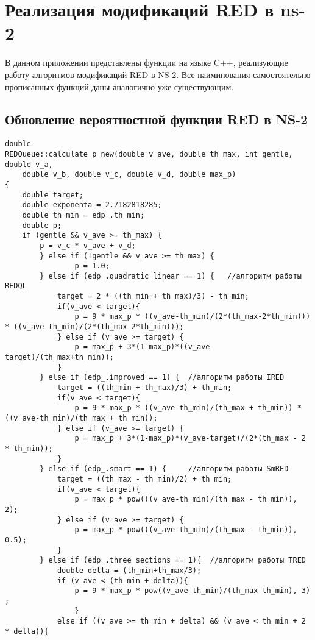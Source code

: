 
\chapter{Реализация модификаций RED в ns-2}
\label{app2}

В данном приложении представлены функции на языке C++, 
реализующие работу алгоритмов модификаций RED в NS-2.
Все наиминования самостоятельно прописанных функций даны 
аналогично уже существующим.

\section{Обновление вероятностной функции RED в NS-2}
\label{app2:sec1}
\begin{verbatim}
double
REDQueue::calculate_p_new(double v_ave, double th_max, int gentle, double v_a, 
	double v_b, double v_c, double v_d, double max_p)
{	
	double target;
	double exponenta = 2.7182818285;
	double th_min = edp_.th_min;
	double p;
	if (gentle && v_ave >= th_max) {
		p = v_c * v_ave + v_d;
        } else if (!gentle && v_ave >= th_max) { 
                p = 1.0;
        } else if (edp_.quadratic_linear == 1) {   //алгоритм работы REDQL
        	target = 2 * ((th_min + th_max)/3) - th_min;
        	if(v_ave < target){
        		p = 9 * max_p * ((v_ave-th_min)/(2*(th_max-2*th_min))) * ((v_ave-th_min)/(2*(th_max-2*th_min)));
        	} else if (v_ave >= target) {
        		p = max_p + 3*(1-max_p)*((v_ave-target)/(th_max+th_min));
        	}
        } else if (edp_.improved == 1) {  //алгоритм работы IRED
        	target = ((th_min + th_max)/3) + th_min;
        	if(v_ave < target){
        		p = 9 * max_p * ((v_ave-th_min)/(th_max + th_min)) * ((v_ave-th_min)/(th_max + th_min));
        	} else if (v_ave >= target) {
        		p = max_p + 3*(1-max_p)*(v_ave-target)/(2*(th_max - 2 * th_min));
        	}
        } else if (edp_.smart == 1) {     //алгоритм работы SmRED
        	target = ((th_max - th_min)/2) + th_min;
        	if(v_ave < target){
        		p = max_p * pow(((v_ave-th_min)/(th_max - th_min)), 2);
        	} else if (v_ave >= target) {
        		p = max_p * pow(((v_ave-th_min)/(th_max - th_min)), 0.5);
        	}
        } else if (edp_.three_sections == 1){  //алгоритм работы TRED
        	double delta = (th_min+th_max/3);
        	if (v_ave < (th_min + delta)){
        		p = 9 * max_p * pow((v_ave-th_min)/(th_max-th_min), 3) ;
        		}
        	else if ((v_ave >= th_min + delta) && (v_ave < th_min + 2 * delta)){

\end{verbatim}
